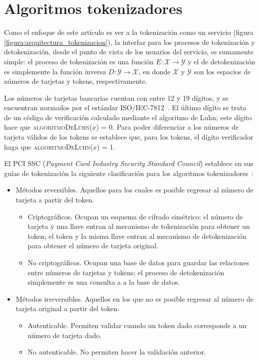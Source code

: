 %
%

\section{Algoritmos tokenizadores}

Como el enfoque de este artículo es ver a la tokenización como un servicio
(figura \ref{figura:arquitectura_tokenizacion}), la interfaz para los procesos
de tokenización y detokenización, desde el punto de vista de los usuarios del
servicio, es sumamente simple: el proceso de tokenización es una función $ E:
\mathcal{X} \rightarrow \mathcal{Y} $ y el de detokenización es  simplemente la
función inversa $ D: \mathcal{Y} \rightarrow \mathcal{X} $, en donde $
\mathcal{X} $ y $ \mathcal{Y} $ son los espacios de números de tarjetas y
tokens, respectivamente.

Los números de tarjetas bancarias cuentan con entre 12 y 19 dígitos, y se
encuentran normados por el estándar ISO/IEC-7812~\cite{iso_7812}. El último
dígito se trata de un código de verificación calculado mediante el algoritmo de
Luhn; este dígito hace que \textsc{algoritmoDeLuhn($ x $) = 0}. Para poder
diferenciar a los números de tarjeta válidos de los tokens se establece que,
para los tokens, el dígito verificador haga que
\textsc{algoritmoDeLuhn($ x $) = 1}.

El PCI SSC (\textit{Payment Card Industry Security Standard Council}) establece
en sus guías de tokenización la siguiente clasificación para los algoritmos
tokenizadores~\cite{pci_tokens}:

\begin{itemize}
  \item Métodos reversibles. Aquellos para los cuales es posible regresar al
    número de tarjeta a partir del token.
    \begin{itemize}
      \item Criptográficos. Ocupan un esquema de cifrado simétrico: el número
        de tarjeta y una llave entran al mecanismo de tokenización para obtener
        un token; el token y la misma llave entran al mecanismo de
        detokenización para obtener el número de tarjeta original.
      \item No criptográficos. Ocupan una base de datos para guardar las
        relaciones entre números de tarjetas y tokens; el proceso de
        detokenización simplemente es una consulta a a la base de datos.
    \end{itemize}
  \item Métodos irreversibles. Aquellos en los que no es posible regresar al
    número de tarjeta original a partir del token.
    \begin{itemize}
      \item Autenticable. Permiten validar cuando un token dado corresponde a
        un número de tarjeta dado.
      \item No autenticable. No permiten hacer la validación anterior.
    \end{itemize}
\end{itemize}

